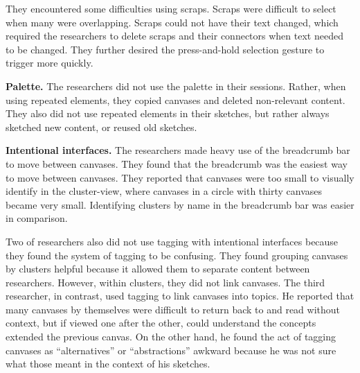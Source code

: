 They encountered some difficulties using scraps. Scraps were difficult to select when many were overlapping. Scraps could not have their text changed, which required the researchers to delete scraps and their connectors when text needed to be changed. They further desired the press-and-hold selection gesture to trigger more quickly.
%
%
%
%
%
%
%

\textbf{Palette.} The researchers did not use the palette in their sessions. Rather, when using repeated elements, they copied canvases and deleted non-relevant content. They also did not use repeated elements in their sketches, but rather always sketched new content, or reused old sketches.

\textbf{Intentional interfaces.} The researchers made heavy use of the breadcrumb bar to move between canvases. They found that the breadcrumb was the easiest way to move between canvases. They reported that canvases were too small to visually identify in the cluster-view, where canvases in a circle with thirty canvases became very small. Identifying clusters by name in the breadcrumb bar was easier in comparison.

Two of researchers also did not use tagging with intentional interfaces because they found the system of tagging to be confusing. They found grouping canvases by clusters helpful because it allowed them to separate content between researchers. However, within clusters, they did not link canvases. The third researcher, in contrast, used tagging to link canvases into topics. He reported that many canvases by themselves were difficult to return back to and read without context, but if viewed one after the other, could understand the concepts extended the previous canvas. On the other hand, he found the act of tagging canvases as ``alternatives'' or ``abstractions'' awkward because he was not sure what those meant in the context of his sketches.

